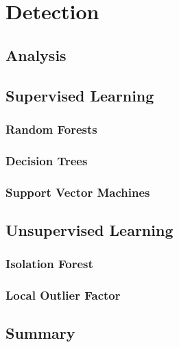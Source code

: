 \chapter{Detection}
\label{chap:Detection}

\section{Analysis}

\section{Supervised Learning}

\subsection{Random Forests}

\subsection{Decision Trees}

\subsection{Support Vector Machines}

\section{Unsupervised Learning}

\subsection{Isolation Forest}

\subsection{Local Outlier Factor}

\section{Summary}
